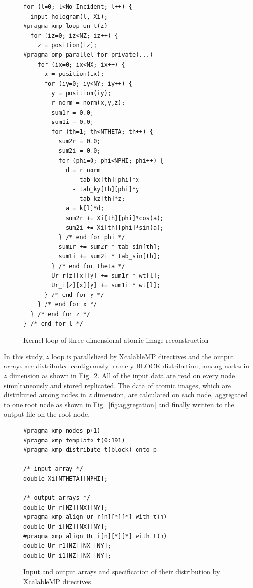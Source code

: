 \documentclass[graybox,vecphys]{svmult}
\begin{document}
\begin{figure}[tb]
\begin{verbatim}
for (l=0; l<No_Incident; l++) {
  input_hologram(l, Xi);
#pragma xmp loop on t(z)
  for (iz=0; iz<NZ; iz++) {
    z = position(iz);
#pragma omp parallel for private(...)
    for (ix=0; ix<NX; ix++) {
      x = position(ix);
      for (iy=0; iy<NY; iy++) {
        y = position(iy);
        r_norm = norm(x,y,z);
        sum1r = 0.0;
        sum1i = 0.0;
        for (th=1; th<NTHETA; th++) {
          sum2r = 0.0;
          sum2i = 0.0;
          for (phi=0; phi<NPHI; phi++) {
            d = r_norm
              - tab_kx[th][phi]*x
              - tab_ky[th][phi]*y
              - tab_kz[th]*z;
            a = k[l]*d;
            sum2r += Xi[th][phi]*cos(a);
            sum2i += Xi[th][phi]*sin(a);
          } /* end for phi */
          sum1r += sum2r * tab_sin[th];
          sum1i += sum2i * tab_sin[th];
        } /* end for theta */
        Ur_r[z][x][y] += sum1r * wt[l];
        Ur_i[z][x][y] += sum1i * wt[l];
      } /* end for y */
    } /* end for x */
  } /* end for z */
} /* end for l */
\end{verbatim}
\begin{center}
  \caption{Kernel loop of three-dimensional atomic image reconstruction}\label{fig:kernel_loop}
\end{center}
\end{figure}

In this study, $z$ loop is parallelized by XcalableMP directives and
the output arrays are distributed contiguously, namely BLOCK
distribution, among nodes in $z$ dimension as shown in
Fig.~\ref{fig:arrays}.  All of the input data are read on every node
simultaneously and stored replicated. The data of atomic images, which
are distributed among nodes in $z$ dimension, are calculated on each
node, aggregated to one root node as shown in Fig.~\ref{fig:aggregation}
and finally written to the output file on the root node.

\begin{figure}[tb]
\begin{verbatim}
#pragma xmp nodes p(1)
#pragma xmp template t(0:191)
#pragma xmp distribute t(block) onto p

/* input array */
double Xi[NTHETA][NPHI];

/* output arrays */
double Ur_r[NZ][NX][NY];
#pragma xmp align Ur_r[n][*][*] with t(n)
double Ur_i[NZ][NX][NY];
#pragma xmp align Ur_i[n][*][*] with t(n)
double Ur_r1[NZ][NX][NY];
double Ur_i1[NZ][NX][NY];
\end{verbatim}
\begin{center}
  \caption{Input and output arrays and specification of their distribution by XcalableMP directives}\label{fig:arrays}
\end{center}
\end{figure}
\end{document}
